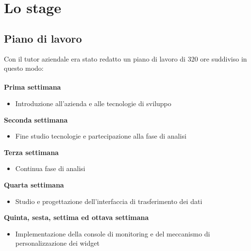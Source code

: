 \documentclass[a4paper, 12pt, twoside, openright]{book}
\begin{document}
\chapter{Lo stage}

\section{Piano di lavoro}
Con il tutor aziendale era stato redatto un piano di lavoro di 320 ore suddiviso in questo modo:\\ \\
\textbf{Prima settimana}
\begin{itemize}
\item Introduzione all'azienda e alle tecnologie di sviluppo
\end{itemize}
\textbf{Seconda settimana}
\begin{itemize}
\item Fine studio tecnologie e partecipazione alla fase di analisi
\end{itemize}
\textbf{Terza settimana}
\begin{itemize}
\item Continua fase di analisi
\end{itemize}
\textbf{Quarta settimana}
\begin{itemize}
\item Studio e progettazione dell'interfaccia di trasferimento dei dati
\end{itemize}
\textbf{Quinta, sesta, settima ed ottava settimana}
\begin{itemize}
\item Implementazione della console di monitoring e del meccanismo di personalizzazione dei widget
\end{itemize}

\newpage{}
\end{document}
